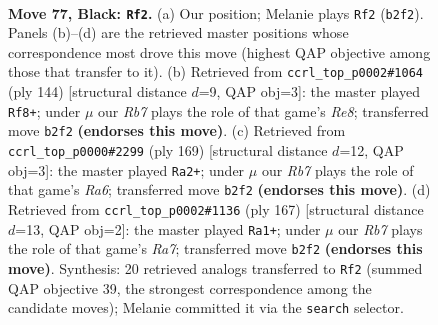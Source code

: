 \documentclass[11pt]{article}
\begin{document}
\clearpage

\begin{figure}[p]\centering
\begin{subfigure}{0.46\textwidth}\centering
\resizebox{\linewidth}{!}{%
\newchessgame
\chessboard[
  setfen={8/p7/P6k/5p2/b4P2/8/1r6/4R2K b - - 5 77},
  showmover=false,
  pgfstyle=straightmove, color=movearrow, markmove={b2-f2}
]}
\caption{}
\end{subfigure}\hfill
\begin{subfigure}{0.46\textwidth}\centering
\resizebox{\linewidth}{!}{%
\newchessgame
\chessboard[
  setfen={4R3/8/r4k2/8/5p2/2P3p1/6P1/5K2 w - - 18 73},
  showmover=false,
  pgfstyle=straightmove, color=movearrow, markmove={e8-f8}
]}
\caption{}
\end{subfigure}
\\[4pt]
\begin{subfigure}{0.46\textwidth}\centering
\resizebox{\linewidth}{!}{%
\newchessgame
\chessboard[
  setfen={8/8/7k/3R4/6p1/r5P1/3K1P2/8 b - - 75 85},
  showmover=false,
  pgfstyle=straightmove, color=movearrow, markmove={a3-a2}
]}
\caption{}
\end{subfigure}\hfill
\begin{subfigure}{0.46\textwidth}\centering
\resizebox{\linewidth}{!}{%
\newchessgame
\chessboard[
  setfen={4R3/8/7k/6p1/6P1/5P2/r7/4K3 b - - 68 84},
  showmover=false,
  pgfstyle=straightmove, color=movearrow, markmove={a2-a1}
]}
\caption{}
\end{subfigure}
\caption{\textbf{Move 77, Black: \texttt{Rf2}.} (a) Our position; Melanie plays \texttt{Rf2} (\texttt{b2f2}). Panels (b)--(d) are the retrieved master positions whose correspondence most drove this move (highest QAP objective among those that transfer to it). (b) Retrieved from \texttt{ccrl\_top\_p0002\#1064} (ply 144) [structural distance $d$=9, QAP obj=3]: the master played \texttt{Rf8+}; under $\mu$ our \emph{Rb7} plays the role of that game's \emph{Re8}; transferred move \texttt{b2f2} \textbf{(endorses this move)}. (c) Retrieved from \texttt{ccrl\_top\_p0000\#2299} (ply 169) [structural distance $d$=12, QAP obj=3]: the master played \texttt{Ra2+}; under $\mu$ our \emph{Rb7} plays the role of that game's \emph{Ra6}; transferred move \texttt{b2f2} \textbf{(endorses this move)}. (d) Retrieved from \texttt{ccrl\_top\_p0002\#1136} (ply 167) [structural distance $d$=13, QAP obj=2]: the master played \texttt{Ra1+}; under $\mu$ our \emph{Rb7} plays the role of that game's \emph{Ra7}; transferred move \texttt{b2f2} \textbf{(endorses this move)}. Synthesis: 20 retrieved analogs transferred to \texttt{Rf2} (summed QAP objective 39, the strongest correspondence among the candidate moves); Melanie committed it via the \texttt{search} selector.}
\label{fig:thought-m153}
\end{figure}
\end{document}

